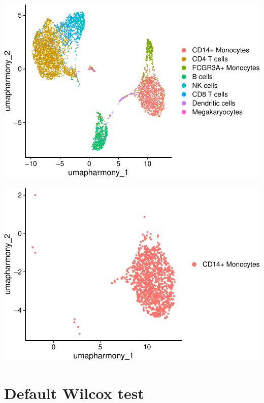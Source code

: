 \documentclass[
]{book}
\newenvironment{Shaded}{\begin{snugshade}}{\end{snugshade}}
\newcommand{\AttributeTok}[1]{\textcolor[rgb]{0.13,0.29,0.53}{#1}}
\newcommand{\FunctionTok}[1]{\textcolor[rgb]{0.13,0.29,0.53}{\textbf{#1}}}
\newcommand{\NormalTok}[1]{#1}
\newcommand{\OtherTok}[1]{\textcolor[rgb]{0.56,0.35,0.01}{#1}}
\newcommand{\SpecialCharTok}[1]{\textcolor[rgb]{0.81,0.36,0.00}{\textbf{#1}}}
\newcommand{\StringTok}[1]{\textcolor[rgb]{0.31,0.60,0.02}{#1}}
\begin{document}
\includegraphics{scRNAseqInR_ABACBS_2024_Doco_files/figure-latex/unnamed-chunk-48-1.pdf}

\begin{Shaded}
\end{Shaded}

\includegraphics{scRNAseqInR_ABACBS_2024_Doco_files/figure-latex/unnamed-chunk-48-2.pdf}

\hypertarget{default-wilcox-test}{%
\section{Default Wilcox test}\label{default-wilcox-test}}
\end{document}

